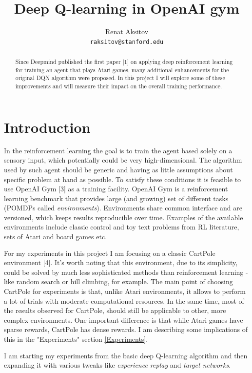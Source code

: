 \documentclass{article}
\title{Deep Q-learning in OpenAI gym}
\author{
  Renat Aksitov\\
  \texttt{raksitov@stanford.edu} \\
}
\begin{document}
\maketitle
\begin{abstract}
  Since Deepmind published the first paper [1] on applying deep reinforcement learning for training an agent that plays Atari games, many additional enhancements for the original DQN algorithm were proposed. In this project I will explore some of these improvements and will measure their impact on the overall training performance.
\end{abstract}

\section{Introduction}

In the reinforcement learning the goal is to train the agent based solely on a sensory input, which potentially could be very high-dimensional. The algorithm used by such agent should be generic and having as little assumptions about specific problem at hand as possible. To satisfy these conditions it is feasible to use OpenAI Gym [3] as a training facility. OpenAI Gym is a reinforcement learning benchmark that provides large (and growing) set of different tasks (POMDPs called \emph{environments}). Environments share common interface and are versioned, which keeps results reproducible over time. Examples of the available environments include classic control and toy text problems from RL literature, sets of Atari and board games etc.

For my experiments in this project I am focusing on a classic CartPole environment [4]. It's worth noting that this environment, due to its simplicity, could be solved by much less sophisticated methods than reinforcement learning - like random search or hill climbing, for example. The main point of choosing CartPole for experiments is that, unlike Atari environments, it allows to perform a lot of trials with moderate computational resources. In the same time, most of the results observed for CartPole, should still be applicable to other, more complex environments. One important difference is that while Atari games have sparse rewards, CartPole has dense rewards. I am describing some implications of this in the "Experiments" section \ref{Experiments}.

I am starting my experiments from the basic deep Q-learning algorithm and then expanding it with various tweaks like \emph{experience replay} and {\it target networks}.
\end{document}
